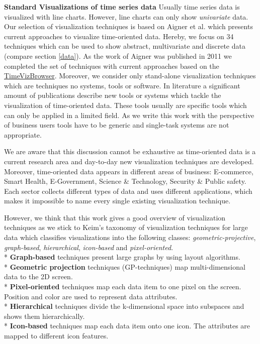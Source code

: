 \textbf{Standard Visualizations of time series data}
Usually time series data is visualized with line charts. However, line charts can only show \textit{univariate} data. Our selection of visualization techniques is based on Aigner et al.\cite{Aigner2011} which presents current approaches to visualize time-oriented data. Hereby, we focus on 34 techniques which can be used to show abstract, multivariate and discrete data (compare section \ref{data}). 
As the work of Aigner was published in 2011 we completed the set of techniques with current approaches based on the \href{http://survey.timeviz.net/}{TimeVizBrowser}. Moreover, we consider only stand-alone visualization techniques which are techniques no systems, tools or software. In literature a significant amount of publications describe new tools or systems which tackle the visualization of time-oriented data. These tools usually are specific tools which can only be applied in a limited field. As we write this work with the perspective of business users tools have to be generic and single-task systems are not appropriate.

We are aware that this discussion cannot be exhaustive as time-oriented data is a current research area and day-to-day new visualization techniques are developed.
Moreover, time-oriented data appears in different areas of business: E-commerce, Smart Health, E-Government, Science \& Technology, Security \& Public safety. Each sector collects different types of data and uses different applications, which makes it impossible to name every single existing visualization technique.


However, we think that this work gives a good overview of visualization techniques as we stick to Keim's taxonomy\cite{Keim1995} of visualization techniques for large data which classifies visualizations into the following classes: \textit{geometric-projective}, \textit{graph-based}, \textit{hierarchical}, \textit{icon-based} and \textit{pixel-oriented}.
\\*
\textbf{Graph-based} techniques present large graphs by using layout algorithms\cite{Keim1996}.\\*
\textbf{Geometric projection} techniques (GP-techniques) map multi-dimensional data to the 2D screen\cite{FerreiradeOliveira2003}.\\*
\textbf{Pixel-oriented} techniques map each data item to one pixel on the screen. Position and color are used to represent data attributes\cite{Keim1996}.\\*
\textbf{Hierarchical} techniques divide the k-dimensional space into subspaces and shows them hierarchically. \\*
\textbf{Icon-based} techniques map each data item onto one icon. The attributes are mapped to different icon features\cite{Keim2001}.



